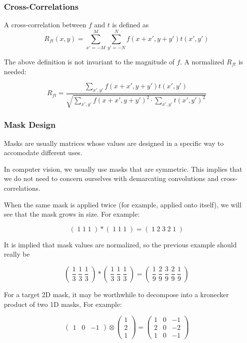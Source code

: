 \documentclass{article}
\begin{document}
\begin{multicols}{3}
\subsubsection{Cross-Correlations}

A cross-correlation between $f$ and $t$ is defined as 
$$
R_{ft}(x, y) = \sum_{x' = -M}^M \sum_{y' = -N}^N f(x+x', y+y') t(x',y')
$$

The above definition is not invariant to the magnitude of $f$. A normalized $R_{ft}$ is needed:

$$
R_{ft} = \frac{\sum_{x', y'}f(x+x', y+y') t(x',y')}{\sqrt{\sum_{x',y'}f(x+x', y+y')^2 \cdot \sum_{x',y'}t(x',y')^2}}
$$

\subsubsection{Mask Design}

Masks are usually matrices whose values are designed in a specific way to accomodate different uses. 

In computer vision, we usually use masks that are symmetric. This implies that we do not need to concern ourselves with demarcating convolutions and cross-correlations.

When the same mask is applied twice (for example, applied onto itself), we will see that the mask grows in size. For example:

$$
( \;1\; 1\; 1\; ) * ( \;1\; 1\; 1\; ) = ( \;1 \;2 \;3 \;2 \;1 \;)
$$

It is implied that mask values are normalized, so the previous example should really be

$$
\left( \;\frac{1}{3}\; \frac{1}{3}\; \frac{1}{3}\; \right) * \left( \;\frac{1}{3}\; \frac{1}{3}\; \frac{1}{3}\; \right) = \left( \;\frac{1}{9} \;\frac{2}{9} \;\frac{3}{9} \;\frac{2}{9} \;\frac{1}{9} \;\right)
$$

For a target 2D mask, it may be worthwhile to decompose into a kronecker product of two 1D masks, For example:

$$
\left(\begin{matrix} 1& 0 & -1 \end{matrix}\right) \otimes \left(\begin{matrix} 1\\ 2\\ 1 \end{matrix}\right) = \left(\begin{matrix} 1 & 0 & -1\\ 2 & 0 & -2\\ 1 & 0 & -1 \end{matrix}\right)
$$


\end{multicols}
\end{document}
